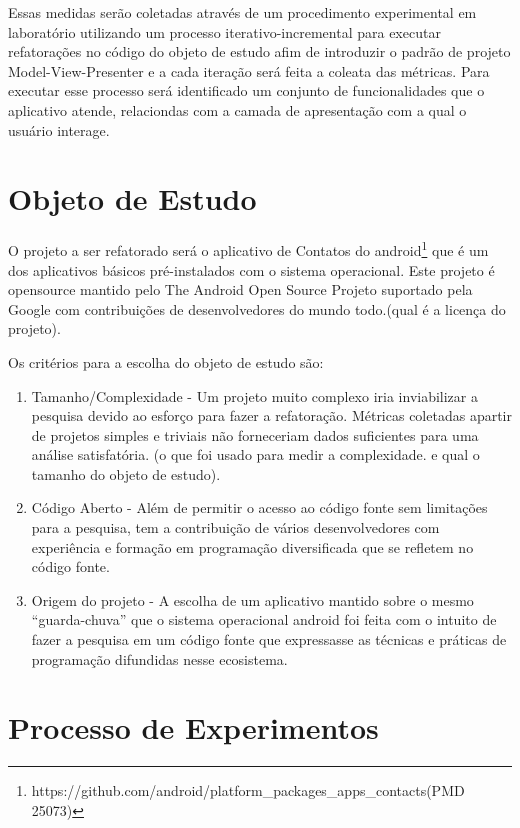 Essas medidas serão coletadas através de um procedimento experimental em
laboratório utilizando um processo iterativo-incremental para executar
refatorações no código do objeto de estudo afim de introduzir o padrão de
projeto Model-View-Presenter e a cada iteração será feita a coleata das
métricas. Para executar esse processo será identificado um conjunto de
funcionalidades que o aplicativo atende, relaciondas com a camada de
apresentação com a qual o usuário interage.



\section{Objeto de Estudo}


O projeto a ser refatorado será o aplicativo de Contatos do
android\footnote{https://github.com/android/platform_packages_apps_contacts(PMD
25073)} que é um dos aplicativos básicos pré-instalados com o sistema
operacional. Este projeto é opensource mantido pelo  The Android Open Source
Projeto suportado pela Google com contribuições de desenvolvedores do mundo
todo.(qual é a licença do projeto).

Os critérios para a escolha do objeto de estudo são:

\begin{enumerate}
  \item Tamanho/Complexidade - Um projeto muito complexo iria inviabilizar a
  pesquisa devido ao esforço para fazer a refatoração. Métricas coletadas
  apartir de projetos simples e triviais não forneceriam dados suficientes para
  uma análise satisfatória. (o que foi usado para medir a complexidade. e qual
  o tamanho do objeto de estudo).
  \item Código Aberto - Além de permitir o acesso ao código fonte sem
  limitações para a pesquisa, tem a contribuição de vários desenvolvedores com
  experiência e formação em programação diversificada que se refletem no código fonte.
  \item Origem do projeto - A escolha de um aplicativo mantido sobre o mesmo
  ``guarda-chuva'' que o sistema operacional android foi feita com o intuito de
  fazer a pesquisa em um código fonte que expressasse as técnicas e práticas de
  programação difundidas nesse ecosistema.
\end{enumerate}

\section{Processo de Experimentos}


